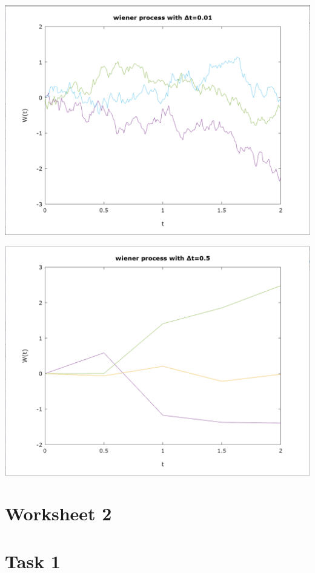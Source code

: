 \documentclass[10pt,a4paper]{article}
\begin{document}
\begin{center}
\includegraphics[scale=0.5]{wiener_001.jpeg}

\includegraphics[scale=0.5]{wiener_05.jpeg}
\end{center}

\section*{Worksheet 2}

\section*{Task 1}
\end{document}
